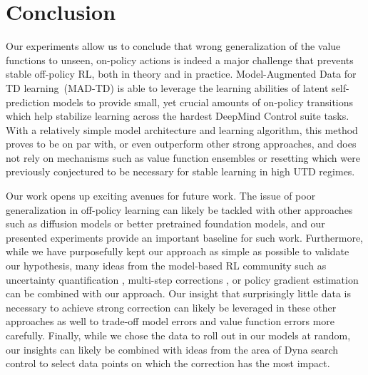 \section{Conclusion}

Our experiments allow us to conclude that wrong generalization of the value functions to unseen, on-policy actions is indeed a major challenge that prevents stable off-policy RL, both in theory and in practice.
Model-Augmented Data for TD learning~(MAD-TD) is able to leverage the learning abilities of latent self-prediction models to provide small, yet crucial amounts of on-policy transitions which help stabilize learning across the hardest DeepMind Control suite tasks.
With a relatively simple model architecture and learning algorithm, this method proves to be on par with, or even outperform other strong approaches, and does not rely on mechanisms such as value function ensembles or resetting which were previously conjectured to be necessary for stable learning in high UTD regimes.

Our work opens up exciting avenues for future work.
The issue of poor generalization in off-policy learning can likely be tackled with other approaches such as diffusion models \parencite{lu2024synthetic} or better pretrained foundation models, and our presented experiments provide an important baseline for such work.
Furthermore, while we have purposefully kept our approach as simple as possible to validate our hypothesis, many ideas from the model-based RL community such as uncertainty quantification \parencite{pets,talvitie2024bounding}, multi-step corrections \parencite{buckman2018sample,hafner2020dream}, or policy gradient estimation \parencite{amos2021model} can be combined with our approach.
Our insight that surprisingly little data is necessary to achieve strong correction can likely be leveraged in these other approaches as well to trade-off model errors and value function errors more carefully.
Finally, while we chose the data to roll out in our models at random, our insights can likely be combined with ideas from the area of Dyna search control \parencite{pan2019hill,pan2020frequency} to select data points on which the correction has the most impact.
